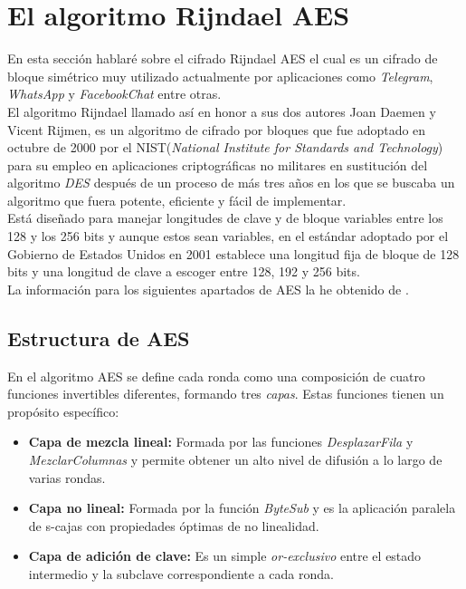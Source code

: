 \newpage
\section{El algoritmo Rijndael AES}
En esta sección hablaré sobre el cifrado Rijndael AES el cual es un cifrado de bloque simétrico muy utilizado actualmente por aplicaciones como \emph{Telegram}, \emph{WhatsApp} y \emph{FacebookChat} entre otras.\\
El algoritmo Rijndael llamado así en honor a sus dos autores Joan Daemen y Vicent Rijmen, es un algoritmo de cifrado por bloques que fue adoptado en octubre de 2000 por el NIST(\emph{National Institute for Standards and Technology}) para su empleo en aplicaciones criptográficas no militares en sustitución del algoritmo \emph{DES} después de un proceso de más tres años en los que se buscaba un algoritmo que fuera potente, eficiente y fácil de implementar.\\
Está diseñado para manejar longitudes de clave y de bloque variables entre los 128 y los 256 bits y aunque estos sean variables, en el estándar adoptado por el Gobierno de Estados Unidos en 2001 \cite{aesUsa} establece una longitud fija de bloque de 128 bits y una longitud de clave a escoger entre 128, 192 y 256 bits.\\
La información para los siguientes apartados de AES la he obtenido de \cite{En2011}.\\

\subsection{Estructura de AES}
En el algoritmo AES se define cada ronda como una composición de cuatro funciones invertibles diferentes, formando tres \emph{capas}. Estas funciones tienen un propósito específico:
\begin{itemize}
	\item \textbf{Capa de mezcla lineal:} Formada por las funciones \emph{DesplazarFila} y \emph{MezclarColumnas} y permite obtener un alto nivel de difusión a lo largo de varias rondas.
	\item \textbf{Capa no lineal:} Formada por la función \emph{ByteSub} y es la aplicación paralela de s-cajas con propiedades óptimas de no linealidad.
	\item \textbf{Capa de adición de clave:} Es un simple \emph{or-exclusivo} entre el estado intermedio y la subclave correspondiente a cada ronda.
\end{itemize}

